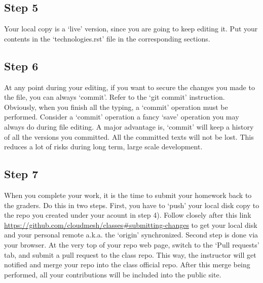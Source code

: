 \subsection{Step 5}\label{step-5}

Your local copy is a `live' version, since you are going to keep editing
it. Put your contents in the `technologies.rst' file in the
corresponding sections.

\subsection{Step 6}\label{step-6}

At any point during your editing, if you want to secure the changes you
made to the file, you can always `commit'. Refer to the `git commit'
instruction. Obviously, when you finish all the typing, a `commit'
operation must be performed. Consider a `commit' operation a fancy
`save' operation you may always do during file editing. A major
advantage is, `commit' will keep a history of all the versions you
committed. All the committed texts will not be lost. This reduces a lot
of risks during long term, large scale development.

\subsection{Step 7}\label{step-7}

When you complete your work, it is the time to submit your homework back
to the graders. Do this in two steps. First, you have to `push' your
local disk copy to the repo you created under your acount in step 4).
Follow closely after this link
\url{https://github.com/cloudmesh/classes\#submitting-changes} to get
your local disk and your personal remote a.k.a. the `origin'
synchronized. Second step is done via your browser. At the very top of
your repo web page, switch to the `Pull requests' tab, and submit a pull
request to the class repo. This way, the instructor will get notified
and merge your repo into the class official repo. After this merge being
performed, all your contributions will be included into the public site.
